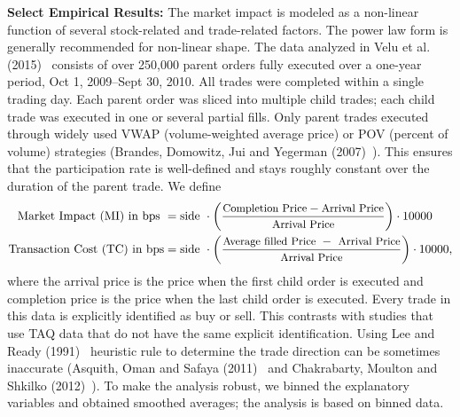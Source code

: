 \noindent\textbf{Select Empirical Results:} The market impact is modeled as a non-linear function of several stock-related and trade-related factors. The power law form is generally recommended for non-linear shape. The data analyzed in Velu et al. (2015)~\cite{unpub} consists of over 250,000 parent orders fully executed over a one-year period, Oct 1, 2009--Sept 30, 2010. All trades were completed within a single trading day. Each parent order was sliced into multiple child trades; each child trade was executed in one or several partial fills. Only parent trades executed through widely used VWAP (volume-weighted average price) or POV (percent of volume) strategies (Brandes, Domowitz, Jui and Yegerman (2007)~\cite{brandes2007}). This ensures that the participation rate is well-defined and stays roughly constant over the duration of the parent trade. We define 
	\[
	\begin{split}
	\text{Market Impact (MI) in bps }&= \text{side } \cdot \left(\dfrac{\text{\small Completion Price} - \text{\small Arrival Price}}{\text{\small Arrival Price}}\right) \cdot 10000 \\
	\text{Transaction Cost (TC) in bps}&= \text{side } \cdot \left(\dfrac{\text{\small Average filled Price }-\text{ \small Arrival Price}}{\text{\small Arrival Price}} \right) \cdot 10000 \normalsize,
	\end{split}
	\]
where the arrival price is the price when the first child order is executed and completion price is the price when the last child order is executed. Every trade in this data is explicitly identified as buy or sell. This contrasts with studies that use TAQ data that do not have the same explicit identification. Using Lee and Ready (1991)~\cite{leeready} heuristic rule to determine the trade direction can be sometimes inaccurate (Asquith, Oman and Safaya (2011)~\cite{asquith2010} and Chakrabarty, Moulton and Shkilko (2012)~\cite{chakrabarty2012short}). To make the analysis robust, we binned the explanatory variables and obtained smoothed averages; the analysis is based on binned data.


